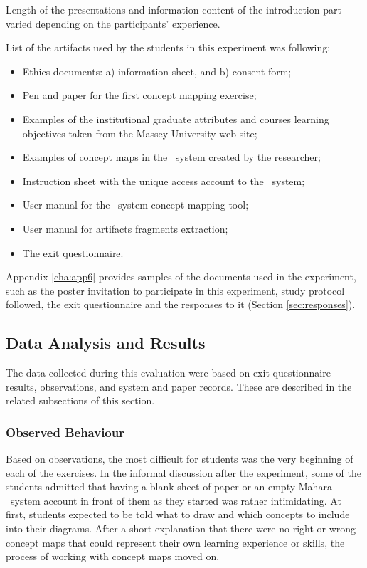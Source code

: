 \FloatBarrier

Length of the presentations and information content of the introduction part
varied depending on the participants' experience.

List of the artifacts used by the students in this experiment was following:

\begin{itemize}
  \item Ethics documents: a) information sheet, and b) consent form;
  \item Pen and paper for the first concept mapping exercise;
  \item Examples of the institutional graduate attributes and courses learning
  objectives taken from the Massey University web-site;
  \item Examples of concept maps in the \ep~system created by the researcher;
  \item Instruction sheet with the unique access account to the \ep~system;
  \item User manual for the \ep~system concept mapping tool;
  \item User manual for artifacts fragments extraction;
  \item The exit questionnaire.
\end{itemize} 

Appendix \ref{cha:app6} provides samples of the documents used in the
experiment, such as the poster invitation to participate in this experiment,
study protocol followed, the exit questionnaire and the responses to it (Section
\ref{sec:responses}).

\subsection{Data Analysis and Results}

The data collected during this evaluation were based on exit questionnaire
results, observations, and system and paper records. These are described in the
related subsections of this section.

\subsubsection{Observed Behaviour}

Based on observations, the most difficult for students was the very beginning of
each of the exercises. In the informal discussion after the experiment, some
of the students admitted that having a blank sheet of paper or an empty Mahara
\ep~system account in front of them as they started was rather intimidating. At
first, students expected to be told what to draw and which concepts to include
into their diagrams. After a short explanation that there were no right or wrong
concept maps that could represent their own learning experience or skills, the
process of working with concept maps moved on.

